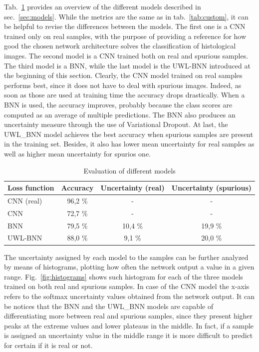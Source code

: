 \documentclass[11pt,twoside,a4paper]{article}
\begin{document}
Tab.~\ref{tab:colab} provides an overview of the different models described in sec.~\ref{sec:models}. While the metrics are the same as in tab.~\ref{tab:custom}, it can be helpful to revise the differences between the models. The first one is a CNN trained only on real samples, with the purpose of providing a reference for how good the chosen network architecture solves the classification of histological images. The second model is a CNN trained both on real and spurious samples. The third model is a BNN, while the last model is the UWL-BNN introduced at the beginning of this section.\newline
Clearly, the CNN model trained on real samples performs best, since it does not have to deal with spurious images. Indeed, as soon as those are used at training time the accuracy drops drastically. When a BNN is used, the accuracy improves, probably because the class scores are computed as an average of multiple predictions. The BNN also produces an uncertainty measure through the use of Variational Dropout. At last, the UWL\_BNN model achieves the best accuracy when spurious samples are present in the training set. Besides, it also has lower mean uncertainty for real samples as well as higher mean uncertainty for spurios one.\newline

\begin{table}[!h]
  \begin{adjustwidth}{-.5in}{-.5in}
  \begin{center}
    \begin{tabular}{l | c | c | c}
      Loss function	& Accuracy	& Uncertainty (real)	& Uncertainty (spurious) \\
      \hline
      CNN (real)	& 96,2 \%		& - 				& - \\      
      CNN		& 72,7 \%		& - 				& - \\      
      BNN		& 79,5 \%		& 10,4 \% 			& 19,9 \% \\      
      UWL-BNN		& 88,0 \%		& 9,1  \% 			& 20,0 \% \\       
    \end{tabular}
    \caption{Evaluation of different models}
    \label{tab:colab}
  \end{center}
  \end{adjustwidth}
\end{table}

The uncertainty assigned by each model to the samples can be further analyzed by means of histograms, plotting how often the network output a value in a given range. Fig.~\ref{fig:histograms} shows such histogram for each of the three models trained on both real and spurious samples. In case of the CNN model the x-axis refers to the softmax uncertainty values obtained from the network output. It can be notices that the BNN and the UWL\_BNN models are capable of differentiating more between real and spurious samples, since they present higher peaks at the extreme values and lower plateaus in the middle. In fact, if a sample is assigned an uncertainty value in the middle range it is more difficult to predict for certain if it is real or not.
\end{document}

